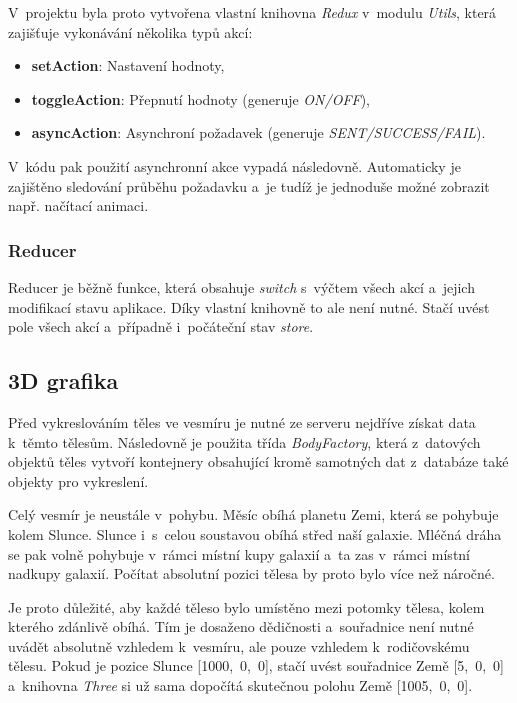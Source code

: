 \documentclass[a4paper,12pt]{article}
\begin{document}
V~projektu byla proto vytvořena vlastní knihovna \textit{Redux} v~modulu \textit{Utils}, která zajišťuje vykonávání několika typů akcí:

\begin{itemize}
\item \textbf{setAction}: Nastavení hodnoty,
\item \textbf{toggleAction}: Přepnutí hodnoty (generuje \textit{ON/OFF}),
\item \textbf{asyncAction}: Asynchroní požadavek (generuje \textit{SENT/SUCCESS/FAIL}).
\end{itemize}

V~kódu pak použití asynchronní akce vypadá následovně. Automaticky je zajištěno sledování průběhu požadavku a~je tudíž je jednoduše možné zobrazit např. načítací animaci.



\subsubsection{Reducer}

Reducer je běžně funkce, která obsahuje \textit{switch} s~výčtem všech akcí a~jejich modifikací stavu aplikace. Díky vlastní knihovně to ale není nutné. Stačí uvést pole všech akcí a~případně i~počáteční stav \textit{store}.



\subsection{3D grafika}

Před vykreslováním těles ve vesmíru je nutné ze serveru nejdříve získat data k~těmto tělesům. Následovně je použita třída \textit{BodyFactory}, která z~datových objektů těles vytvoří kontejnery obsahující kromě samotných dat z~databáze také objekty pro vykreslení.

Celý vesmír je neustále v~pohybu. Měsíc obíhá planetu Zemi, která se pohybuje kolem Slunce. Slunce i~s~celou soustavou obíhá střed naší galaxie. Mléčná dráha se pak volně pohybuje v~rámci místní kupy galaxií a~ta zas v~rámci místní nadkupy galaxií. Počítat absolutní pozici tělesa by proto bylo více než náročné.

Je proto důležité, aby každé těleso bylo umístěno mezi potomky tělesa, kolem kterého zdánlivě obíhá. Tím je dosaženo dědičnosti a~souřadnice není nutné uvádět absolutně vzhledem k~vesmíru, ale pouze vzhledem k~rodičovskému tělesu. Pokud je pozice Slunce [1000,~0,~0], stačí uvést souřadnice Země [5,~0,~0] a~knihovna \textit{Three} si už sama dopočítá skutečnou polohu Země [1005,~0,~0].
\end{document}
